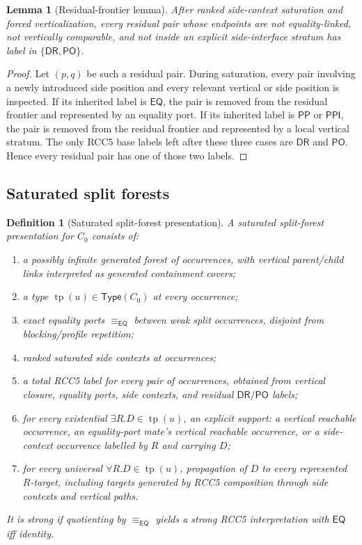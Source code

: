 \documentclass[11pt]{article}
\newtheorem{lemma}[theorem]{Lemma}
\newtheorem{definition}[theorem]{Definition}
\newcommand{\EQ}{\mathsf{EQ}}
\newcommand{\PP}{\mathsf{PP}}
\newcommand{\PPI}{\mathsf{PPI}}
\newcommand{\PO}{\mathsf{PO}}
\newcommand{\DR}{\mathsf{DR}}
\newcommand{\tp}{\operatorname{tp}}
\newcommand{\Typ}{\mathsf{Type}}
\newcommand{\eqE}{\equiv_{\EQ}}
\begin{document}
\begin{lemma}[Residual-frontier lemma]
After ranked side-context saturation and forced verticalization, every residual pair whose endpoints are not equality-linked, not vertically comparable, and not inside an explicit side-interface stratum has label in $\{\DR,\PO\}$.
\end{lemma}

\begin{proof}
Let $(p,q)$ be such a residual pair.  During saturation, every pair involving a newly introduced side position and every relevant vertical or side position is inspected.  If its inherited label is $\EQ$, the pair is removed from the residual frontier and represented by an equality port.  If its inherited label is $\PP$ or $\PPI$, the pair is removed from the residual frontier and represented by a local vertical stratum.  The only RCC5 base labels left after these three cases are $\DR$ and $\PO$.  Hence every residual pair has one of those two labels.
\end{proof}

\subsection{Saturated split forests}

\begin{definition}[Saturated split-forest presentation]
A saturated split-forest presentation for $C_0$ consists of:
\begin{enumerate}[label=(F\arabic*)]
\item a possibly infinite generated forest of occurrences, with vertical parent/child links interpreted as generated containment covers;
\item a type $\tp(u)\in\Typ(C_0)$ at every occurrence;
\item exact equality ports $\eqE$ between weak split occurrences, disjoint from blocking/profile repetition;
\item ranked saturated side contexts at occurrences;
\item a total RCC5 label for every pair of occurrences, obtained from vertical closure, equality ports, side contexts, and residual $\DR/\PO$ labels;
\item for every existential $\exists R.D\in\tp(u)$, an explicit support: a vertical reachable occurrence, an equality-port mate's vertical reachable occurrence, or a side-context occurrence labelled by $R$ and carrying $D$;
\item for every universal $\forall R.D\in\tp(u)$, propagation of $D$ to every represented $R$-target, including targets generated by RCC5 composition through side contexts and vertical paths.
\end{enumerate}
It is strong if quotienting by $\eqE$ yields a strong RCC5 interpretation with $\EQ$ iff identity.
\end{definition}
\end{document}
